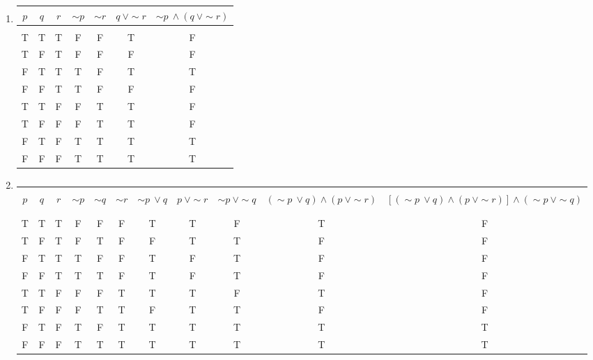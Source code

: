 \begin{enumerate}
\item 
\begin{center}
\begin{tabular}{|c | c | c | c | c | c | c|}
\hline
$p$ & $q$ & $r$ & $\sim p$ & $\sim r$ & $q\ \vee \sim r$ & $\sim p\ \wedge (q\ \vee \sim r)$\\
\hline
& & & & & & \\
T & T & T & F & F & T & F\\
T & F & T & F & F & F & F\\
F & T & T & T & F & T & T\\
F & F & T & T & F & F & F\\
T & T & F & F & T & T & F\\
T & F & F & F & T & T & F\\
F & T & F & T & T & T & T\\
F & F & F & T & T & T & T\\
\hline
\end{tabular}
\end{center}

\item {\footnotesize
\begin{center}
\begin{tabular}{|c | c | c | c | c | c | c | c | c | c | c|}
\hline
& & & & & & & & & &\\
$p$ & $q$ & $r$ & $\sim p$ & $\sim q$ & $\sim r$ & $\sim p\ \vee q$ & $p\ \vee \sim r$ & $\sim p\ \vee \sim q$ & $(\sim p\ \vee q) \wedge (p\ \vee \sim r)$ & $[(\sim p\ \vee q) \wedge (p\ \vee \sim r)] \wedge (\sim p\ \vee \sim q)$\\
& & & & & & & & & &\\
\hline
& & & & & & & & & &\\
T & T & T & F & F & F & T & T & F & T & F\\
T & F & T & F & T & F & F & T & T & F & F\\
F & T & T & T & F & F & T & F & T & F & F\\
F & F & T & T & T & F & T & F & T & F & F\\
T & T & F & F & F & T & T & T & F & T & F\\
T & F & F & F & T & T & F & T & T & F & F\\
F & T & F & T & F & T & T & T & T & T & T\\
F & F & F & T & T & T & T & T & T & T & T\\
\hline
\end{tabular}
\end{center}}
\end{enumerate}

